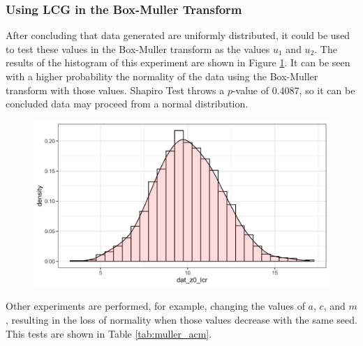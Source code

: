 \documentclass[10pt,leter,openany]{article}
\begin{document}

	\subsubsection{Using LCG in the  Box-Muller Transform}

		After concluding that data generated are uniformly distributed, it could be used to test these values in the Box-Muller transform as the values $ u_{1} $ and $u_{2}$. 
		The results of the histogram of this experiment are shown in Figure \ref{fig:hist2}. It can be seen with a higher probability the normality of the data using the Box-Muller transform with those values. Shapiro Test throws a $p$-value of  0.4087, so it can be concluded data may proceed from a normal distribution.


		\begin{figure}
			\begin{center}
				\includegraphics[scale=0.30]{extras/hist2}
				\label{fig:hist2}
			\end{center}
		\end{figure}


		Other experiments are performed, for example, changing the values of $ a $, $ c $, and $ m $, resulting in the loss of normality when those values decrease with the same seed. This tests are shown in Table \ref{tab:muller_acm}.
\end{document}
